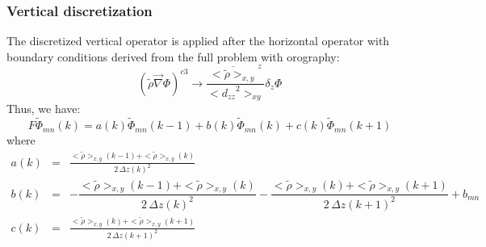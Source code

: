 \subsubsection{Vertical discretization}
The discretized vertical operator is applied after the horizontal operator with
boundary conditions derived from the full problem with orography:
\begin{equation}
\left( \tilde{\rho}  \overrightarrow{\nabla} \Phi \right) ^{c3}
\rightarrow \dfrac{\overline{< \tilde{\rho} >_{x,y}}^z} {<{d_{zz}}^2>_{xy}}
\delta _z \Phi
\end{equation}
Thus, we have:
\begin{displaymath}
F \tilde{\Phi} _{m n} (k) =
a(k) \tilde{\Phi} _{m n }  (k-1) + b(k) \tilde{ \Phi} _{m n} (k)  +  c(k)
\tilde{\Phi} _{m n} (k+1)
\end{displaymath}
where
\begin{eqnarray*}
a(k) &=& \frac {< \tilde{\rho} >_{x,y}(k-1) + < \tilde{\rho} >_{x,y}(k)}
 {2 \,\Delta z(k)^2} \\
b(k) &=& -  \dfrac {< \tilde{\rho} >_{x,y}(k-1) +  < \tilde{\rho} >_{x,y}(k)}
{2 \, \Delta z(k)^2}
-  \dfrac { < \tilde{\rho} >_{x,y}(k)+< \tilde{\rho} >_{x,y}(k+1)}
{2 \, \Delta z(k+1)^2}  + b_{mn} \\
c(k) &=& \frac {< \tilde{\rho} >_{x,y}(k) + < \tilde{\rho} >_{x,y}(k+1) }
 {2 \, \Delta z(k+1)^2}
\end{eqnarray*}
